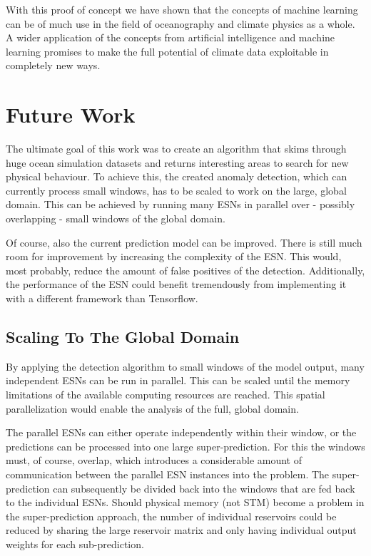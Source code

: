With this proof of concept we have shown that the concepts of machine learning
can be of much use in the field of oceanography and climate physics as a whole.
A wider application of the concepts from artificial intelligence and machine
learning promises to make the full potential of climate data exploitable in
completely new ways.



\section{Future Work}%
\label{sec:future_work}

The ultimate goal of this work was to create an algorithm that skims through
huge ocean simulation datasets and returns interesting areas to search for new
physical behaviour. To achieve this, the created anomaly detection, which
can currently process small windows, has to be scaled to work on the large,
global domain. This can be achieved by running many ESNs in parallel over -
possibly overlapping - small windows of the global domain.

Of course, also the current  prediction model can be improved. There is still
much room for improvement by increasing the complexity of the ESN. This would,
most probably, reduce the amount of false positives of the detection.
Additionally, the performance of the ESN could benefit tremendously from
implementing it with a different framework than Tensorflow.

\subsection{Scaling To The Global Domain}%
\label{sub:scaling_to_the_global_domain}

By applying the detection algorithm to small windows of the model output, many
independent ESNs can be run in parallel. This can be scaled until the memory
limitations of the available computing resources are reached.
This spatial parallelization would enable the analysis of the full, global domain.

The parallel ESNs can either operate independently within their window, or the
predictions can be processed into one large super-prediction. For this the
windows must, of course, overlap, which introduces a considerable amount of
communication between the parallel ESN instances into the problem. The
super-prediction can subsequently be divided back into the windows that are fed
back to the individual ESNs. Should physical memory (not STM) become a problem in
the super-prediction approach, the number of individual reservoirs could be
reduced by sharing the large reservoir matrix and only having individual output
weights for each sub-prediction.

